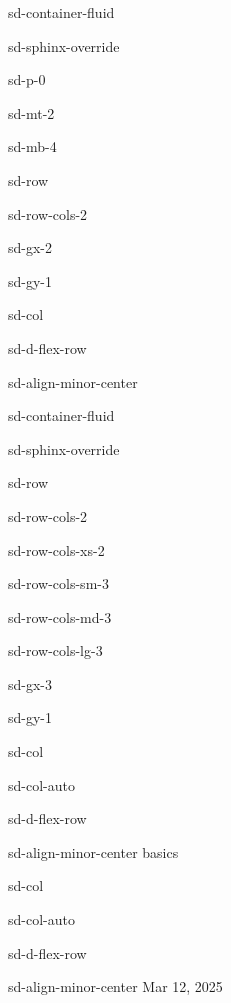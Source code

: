 \documentclass[letterpaper,10pt,english]{jupyterBook}
\begin{document}
\begin{sphinxuseclass}{sd-container-fluid}
\begin{sphinxuseclass}{sd-sphinx-override}
\begin{sphinxuseclass}{sd-p-0}
\begin{sphinxuseclass}{sd-mt-2}
\begin{sphinxuseclass}{sd-mb-4}
\begin{sphinxuseclass}{sd-row}
\begin{sphinxuseclass}{sd-row-cols-2}
\begin{sphinxuseclass}{sd-gx-2}
\begin{sphinxuseclass}{sd-gy-1}
\begin{sphinxuseclass}{sd-col}
\begin{sphinxuseclass}{sd-d-flex-row}
\begin{sphinxuseclass}{sd-align-minor-center}
\begin{sphinxuseclass}{sd-container-fluid}
\begin{sphinxuseclass}{sd-sphinx-override}
\begin{sphinxuseclass}{sd-row}
\begin{sphinxuseclass}{sd-row-cols-2}
\begin{sphinxuseclass}{sd-row-cols-xs-2}
\begin{sphinxuseclass}{sd-row-cols-sm-3}
\begin{sphinxuseclass}{sd-row-cols-md-3}
\begin{sphinxuseclass}{sd-row-cols-lg-3}
\begin{sphinxuseclass}{sd-gx-3}
\begin{sphinxuseclass}{sd-gy-1}
\begin{sphinxuseclass}{sd-col}
\begin{sphinxuseclass}{sd-col-auto}
\begin{sphinxuseclass}{sd-d-flex-row}
\begin{sphinxuseclass}{sd-align-minor-center}
\sphinxAtStartPar
basics

\end{sphinxuseclass}
\end{sphinxuseclass}
\end{sphinxuseclass}
\end{sphinxuseclass}
\begin{sphinxuseclass}{sd-col}
\begin{sphinxuseclass}{sd-col-auto}
\begin{sphinxuseclass}{sd-d-flex-row}
\begin{sphinxuseclass}{sd-align-minor-center}
\sphinxAtStartPar
Mar 12, 2025


\end{sphinxuseclass}
\end{sphinxuseclass}
\end{sphinxuseclass}
\end{sphinxuseclass}
\end{sphinxuseclass}
\end{sphinxuseclass}
\end{sphinxuseclass}
\end{sphinxuseclass}
\end{sphinxuseclass}
\end{sphinxuseclass}
\end{sphinxuseclass}
\end{sphinxuseclass}
\end{sphinxuseclass}
\end{sphinxuseclass}
\end{sphinxuseclass}
\end{sphinxuseclass}
\end{sphinxuseclass}
\end{sphinxuseclass}
\end{sphinxuseclass}
\end{sphinxuseclass}
\end{sphinxuseclass}
\end{sphinxuseclass}
\end{sphinxuseclass}
\end{sphinxuseclass}
\end{sphinxuseclass}
\end{sphinxuseclass}
\end{document}
